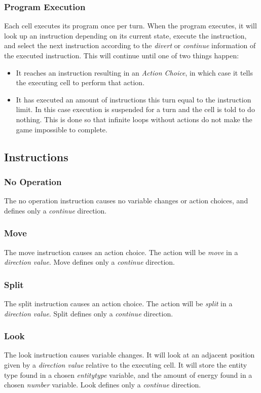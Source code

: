 \subsubsection{Program Execution}

Each cell executes its program once per turn. When the program executes, it will look up an instruction depending on its current state, execute the instruction, and select the next instruction according to the \emph{divert} or \emph{continue} information of the executed instruction. This will continue until one of two things happen:
\begin{itemize}
\item It reaches an instruction resulting in an \emph{Action Choice}, in which case it tells the executing cell to perform that action.
\item It has executed an amount of instructions this turn equal to the instruction limit. In this case execution is suspended for a turn and the cell is told to do nothing. This is done so that infinite loops without actions do not make the game impossible to complete.
\end{itemize}

\subsection{Instructions}
\label{sub:instructions}

\subsubsection{No Operation}
The no operation instruction causes no variable changes or action choices, and defines only a \emph{continue} direction.

\subsubsection{Move}
The move instruction causes an action choice. The action will be \emph{move} in a \emph{direction value}. Move defines only a \emph{continue} direction.

\subsubsection{Split}
The split instruction causes an action choice. The action will be \emph{split} in a \emph{direction value}. Split defines only a \emph{continue} direction.

\subsubsection{Look}
The look instruction causes variable changes. It will look at an adjacent position given by a \emph{direction value} relative to the executing cell. It will store the entity type found in a chosen \emph{entitytype} variable, and the amount of energy found in a chosen \emph{number} variable. Look defines only a \emph{continue} direction.

